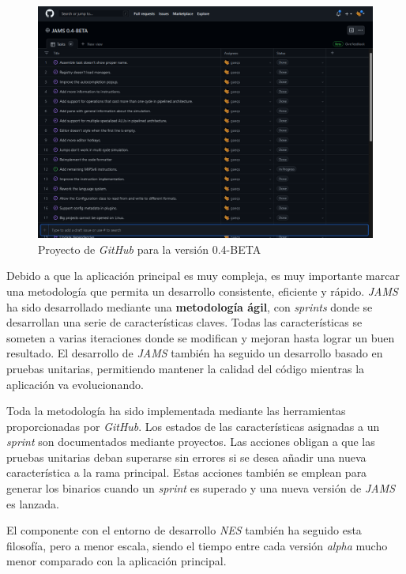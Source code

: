 \begin{figure}[h]
    \centering
    \includegraphics[width=\textwidth]{images/introduction/github}
    \caption{Proyecto de \textit{GitHub} para la versión 0.4-BETA}
    \label{fig:introduccion-github}
\end{figure}

 Debido a que la aplicación principal es muy compleja,
es muy importante marcar una metodología que permita un
desarrollo consistente, eficiente y rápido.
\textit{JAMS} ha sido desarrollado mediante una \textbf{metodología ágil},
con \textit{sprints} donde se desarrollan una serie de características claves.
Todas las características se someten a varias iteraciones donde se modifican y mejoran hasta lograr un
buen resultado.
El desarrollo de \textit{JAMS} también ha seguido un desarrollo
basado en pruebas unitarias, permitiendo mantener la calidad del
código mientras la aplicación va evolucionando.

 Toda la metodología ha sido implementada mediante
las herramientas proporcionadas por \textit{GitHub}.
Los estados de las características asignadas a un \textit{sprint}
son documentados mediante proyectos.
Las acciones obligan a que las pruebas unitarias deban superarse
sin errores si se desea añadir una nueva característica a la rama principal.
Estas acciones también se emplean para generar los binarios
cuando un \textit{sprint} es superado y una
nueva versión de \textit{JAMS} es lanzada.

 El componente con el entorno de desarrollo \textit{NES}
también ha seguido esta filosofía, pero a menor escala, siendo el
tiempo entre cada versión \textit{alpha} mucho menor comparado
con la aplicación principal.